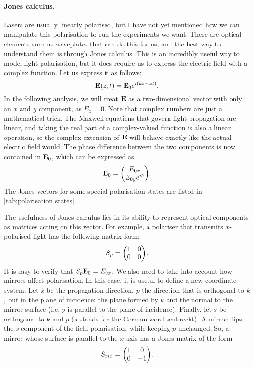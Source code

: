 \paragraph{Jones calculus.} Lasers are usually linearly polarised, but I have not yet mentioned how we can manipulate this polarisation to run the experiments we want. There are optical elements such as waveplates that can do this for us, and the best way to understand them is through Jones calculus. This is an incredibly useful way to model light polarisation, but it does require us to express the electric field with a complex function. Let us express it as follows:
\begin{equation}
	\vb{E}(z, t) = \vb{E}_0 e^{i(kz-\omega t)}.
	\label{eq:propagator}
\end{equation}
In the following analysis, we will treat $ \vb{E} $ as a two-dimensional vector with only an $ x $ and $ y $ component, as $ E_z = 0 $. Note that complex numbers are just a mathematical trick. The Maxwell equations that govern light propagation are linear, and taking the real part of a complex-valued function is also a linear operation, so the complex extension of $ \vb{E} $ will behave exactly like the actual electric field would. The phase difference between the two components is now contained in $ \vb{E}_0 $, which can be expressed as
\begin{equation}
	\vb{E}_0 = \mqty(\Eox \\ \Eoy e^{i\delta} ).
\end{equation}
The Jones vectors for some special polarisation states are listed in \autoref{tab:polarisation states}.

The usefulness of Jones calculus lies in its ability to represent optical components as matrices acting on this vector. For example, a polariser that transmits $ x $-polarised light has the following matrix form:
\begin{equation}
	S_p = \mqty(1 & 0 \\ 0 & 0).
\end{equation}
It is easy to verify that $ S_p \vb{E}_0 = E_{0x} $. We also need to take into account how mirrors affect polarisation. In this case, it is useful to define a new coordinate system. Let $ k $ be the propagation direction, $ p $ the direction that is orthogonal to $ k $, but in the plane of incidence: the plane formed by $ k $ and the normal to the mirror surface (i.e. $ p $ is parallel to the plane of incidence). Finally, let $ s $ be orthogonal to $ k $ and $ p $ ($ s $ stands for the German word senkrecht). A mirror flips the $ s $ component of the field polarisation, while keeping $ p $ unchanged. So, a mirror whose surface is parallel to the $ x $-axis has a Jones matrix of the form
\begin{equation}
	S_{mx} = \mqty(1 & 0 \\ 0 & -1).
\end{equation}

